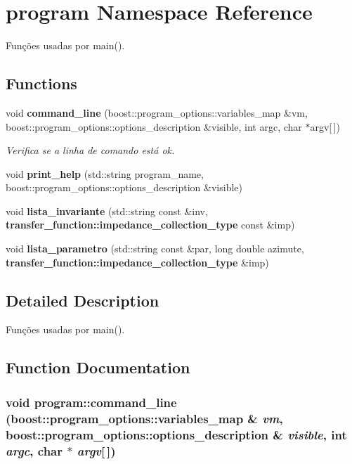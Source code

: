 \section{program Namespace Reference}
\label{namespaceprogram}
Funções usadas por main().  


\subsection*{Functions}
\begin{CompactItemize}
\item 
void {\bf command\_\-line} (boost::program\_\-options::variables\_\-map \&vm, boost::program\_\-options::options\_\-description \&visible, int argc, char $\ast$argv[$\,$])
\begin{CompactList}\small\item\em Verifica se a linha de comando está ok. \item\end{CompactList}\item 
void \textbf{print\_\-help} (std::string program\_\-name, boost::program\_\-options::options\_\-description \&visible)\label{namespaceprogram_b30b3cb55a8d460a42b9406bddb92e31}

\item 
void \textbf{lista\_\-invariante} (std::string const \&inv, {\bf transfer\_\-function::impedance\_\-collection\_\-type} const \&imp)\label{namespaceprogram_1c62d8e941f08730fed291d7d1bb9406}

\item 
void \textbf{lista\_\-parametro} (std::string const \&par, long double azimute, {\bf transfer\_\-function::impedance\_\-collection\_\-type} \&imp)\label{namespaceprogram_12f094beeb6628da4cf0fc8e4e5acf40}

\end{CompactItemize}


\subsection{Detailed Description}
Funções usadas por main(). 

\subsection{Function Documentation}
\subsubsection{\setlength{\rightskip}{0pt plus 5cm}void program::command\_\-line (boost::program\_\-options::variables\_\-map \& {\em vm}, \/  boost::program\_\-options::options\_\-description \& {\em visible}, \/  int {\em argc}, \/  char $\ast$ {\em argv}[$\,$])}\label{namespaceprogram_1a36e303e30dd85a03d46402651a684d}


